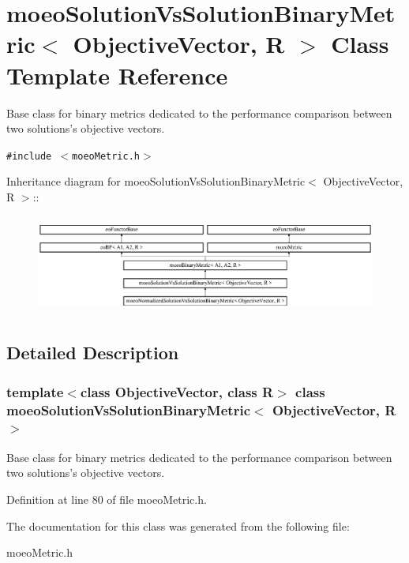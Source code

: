 \section{moeo\-Solution\-Vs\-Solution\-Binary\-Metric$<$ Objective\-Vector, R $>$ Class Template Reference}
\label{classmoeoSolutionVsSolutionBinaryMetric}
Base class for binary metrics dedicated to the performance comparison between two solutions's objective vectors.  


{\tt \#include $<$moeo\-Metric.h$>$}

Inheritance diagram for moeo\-Solution\-Vs\-Solution\-Binary\-Metric$<$ Objective\-Vector, R $>$::\begin{figure}[H]
\begin{center}
\leavevmode
\includegraphics[height=3.30189cm]{classmoeoSolutionVsSolutionBinaryMetric}
\end{center}
\end{figure}


\subsection{Detailed Description}
\subsubsection*{template$<$class Objective\-Vector, class R$>$ class moeo\-Solution\-Vs\-Solution\-Binary\-Metric$<$ Objective\-Vector, R $>$}

Base class for binary metrics dedicated to the performance comparison between two solutions's objective vectors. 



Definition at line 80 of file moeo\-Metric.h.

The documentation for this class was generated from the following file:\begin{CompactItemize}
\item 
moeo\-Metric.h\end{CompactItemize}
